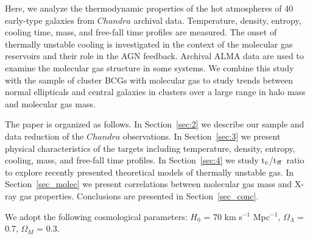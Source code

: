 \documentclass[iop]{emulateapj}
\newcommand{\tctff}{{t$_{\rm c}$/t$_{\rm ff}$}}
\begin{document}
Here, we analyze the  thermodynamic properties of the hot atmospheres of 40 early-type galaxies from $Chandra$ archival data. Temperature, density, entropy, cooling time, mass, and free-fall time profiles are measured. The onset of thermally unstable cooling is investigated in the context of the molecular gas reservoirs and their role in the AGN feedback.  Archival ALMA data are used to examine the molecular gas structure in some systems. We combine this study with the \citet{Pulido:17} sample of cluster BCGs with molecular gas to study trends between normal ellipticals and central galaxies in clusters over a large range in halo mass and molecular gas mass.

The paper is organized as follows. In Section~\ref{sec:2} we describe our sample and data reduction of the $Chandra$ observations. In Section~\ref{sec:3} we present physical characteristics of the targets including temperature, density, entropy, cooling, mass, and free-fall time profiles. In Section~\ref{sec:4} we study \tctff\ ratio to explore recently presented theoretical models of thermally unstable gas. In Section~\ref{sec_molec} we present correlations between molecular gas mass and X-ray gas properties. Conclusions are presented in Section~\ref{sec_conc}.

We adopt the following cosmological parameters: $H_0$ = 70 km s$^{-1}$ Mpc$^{-1}$, $\Omega_{\Lambda}$ = 0.7, $\Omega_{M}$ = 0.3. 
\end{document}
